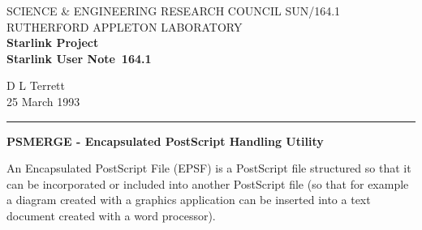 \pagestyle{myheadings}

\newcommand{\stardoccategory}  {Starlink User Note}
\newcommand{\stardocinitials}  {SUN}
\newcommand{\stardocnumber}    {164.1}
\newcommand{\stardocauthors}   {D L Terrett}
\newcommand{\stardocdate}      {25 March 1993}
\newcommand{\stardoctitle}     {PSMERGE - Encapsulated PostScript Handling
Utility}

\newcommand{\stardocname}{\stardocinitials /\stardocnumber}
\renewcommand{\_}{{\tt\char'137}}     %
\markright{\stardocname}
\setlength{\textwidth}{160mm}
\setlength{\textheight}{230mm}
\setlength{\topmargin}{-2mm}
\setlength{\oddsidemargin}{0mm}
\setlength{\evensidemargin}{0mm}
\setlength{\parindent}{0mm}
\setlength{\parskip}{\medskipamount}
\setlength{\unitlength}{1mm}



\thispagestyle{empty}
SCIENCE \& ENGINEERING RESEARCH COUNCIL \hfill \stardocname\\
RUTHERFORD APPLETON LABORATORY\\
{\large\bf Starlink Project\\}
{\large\bf \stardoccategory\ \stardocnumber}
\begin{flushright}
\stardocauthors\\
\stardocdate
\end{flushright}
\vspace{-4mm}
\rule{\textwidth}{0.5mm}
\vspace{5mm}
\begin{center}
{\Large\bf \stardoctitle}
\end{center}
\vspace{5mm}


An Encapsulated PostScript File (EPSF) is a PostScript file structured so that
it can be incorporated or included into another PostScript file (so that for
example a diagram created with a graphics application can be inserted into a
text document created with a word processor).


